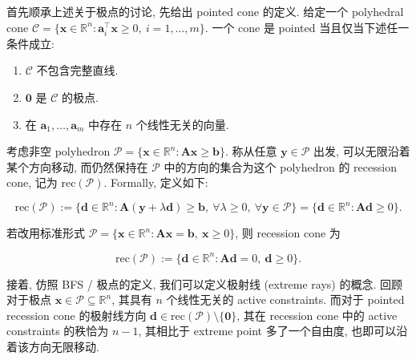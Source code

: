 \begin{defblock}
首先顺承上述关于极点的讨论, 先给出 pointed cone 的定义. 给定一个 polyhedral cone $\mathcal{C} = \{\bm{x} \in \mathbb{R}^n: \bm{a}_i^\top \bm{x} \geq 0,~ i=1,\dots,m\}$. 一个 cone 是 pointed 当且仅当下述任一条件成立:

\begin{enumerate}
\item {}$\mathcal{C}$ 不包含完整直线.


\item {}$\bm{0}$ 是 $\mathcal{C}$ 的极点.


\item {}在 $\bm{a}_1, \dots, \bm{a}_m$ 中存在 $n$ 个线性无关的向量.


\end{enumerate}

\end{defblock}


\begin{defblock}
考虑非空 polyhedron $\mathcal{P} = \{\bm{x} \in \mathbb{R}^n: \bm{A}\bm{x} \geq \bm{b}\}$. 称从任意 $\bm{y} \in \mathcal{P}$ 出发, 可以无限沿着某个方向移动, 而仍然保持在 $\mathcal{P}$ 中的方向的集合为这个 polyhedron 的 recession cone, 记为 $\mathrm{rec}(\mathcal{P})$. Formally, 定义如下:

\[
\mathrm{rec}(\mathcal{P}) := \{\bm{d} \in \mathbb{R}^n: \bm{A}(\bm{y} + \lambda \bm{d}) \geq \bm{b},~ \forall \lambda \geq 0,~ \forall \bm{y} \in \mathcal{P}\} = \{\bm{d} \in \mathbb{R}^n: \bm{A}\bm{d} \geq 0\}.
\]

若改用标准形式 $\mathcal{P} = \{\bm{x} \in \mathbb{R}^n: \bm{A}\bm{x} = \bm{b},~ \bm{x} \geq 0\}$, 则 recession cone 为

\[
\mathrm{rec}(\mathcal{P}) := \{\bm{d} \in \mathbb{R}^n: \bm{A}\bm{d} = 0,~ \bm{d} \geq 0\}.
\]

\end{defblock}


\begin{defblock}
接着, 仿照 BFS / 极点的定义, 我们可以定义极射线 (extreme rays) 的概念. 回顾对于极点 $\bm{x} \in \mathcal{P} \subseteq \mathbb{R}^n$, 其具有 $n$ 个线性无关的 active constraints. 而对于 pointed recession cone 的极射线方向 $\bm{d} \in \mathrm{rec}(\mathcal{P}) \setminus \{\bm{0}\}$, 其在 recession cone 中的 active constraints 的秩恰为 $n-1$, 其相比于 extreme point 多了一个自由度, 也即可以沿着该方向无限移动.

\end{defblock}

